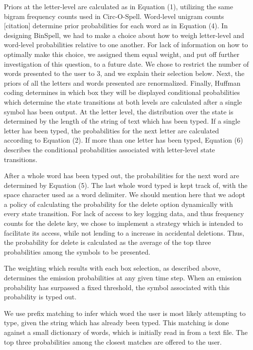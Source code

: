 \documentclass[12pt,titlepage]{article}
\begin{document}
Priors at the letter-level are calculated as in Equation (1), utilizing the same bigram frequency counts 
used in Circ-O-Spell.  Word-level unigram counts [citation] determine prior probabilities for each word 
as in Equation (4).  In designing BinSpell, we had to make a choice about how to weigh letter-level and 
word-level probabilities relative to one another.  For lack of information on how to optimally make this 
choice, we assigned them equal weight, and put off further investigation of this question, to a future 
date.  We chose to restrict the number of words presented to the user to 3, and we explain their 
selection below.  Next, the priors of all the letters and words presented are renormalized.  Finally, 
Huffman coding determines in which box they will be displayed conditional probabilities which 
determine the state transitions at both levels are calculated after a single symbol has been output.  At 
the letter level, the distribution over the state is determined by the length of the string of text which has 
been typed.  If a single letter has been typed, the probabilities for  the next letter are calculated 
according to Equation (2).  If more than one letter has been typed, Equation (6) describes the 
conditional probabilities associated with letter-level state transitions.

After a whole word has been typed out, the probabilities for the next word are determined by Equation 
(5).  The last whole word typed is kept track of, with the space character used as a word delimiter.  We 
should mention here that we adopt a policy of calculating the probability for the delete option 
dynamically with every state transition.  For lack of access to key logging data, and thus frequency 
counts for the delete key, we chose to implement a strategy which is intended to facilitate its access, 
while not lending to a increase in accidental deletions.   Thus, the probability for delete is calculated as 
the average of the top three probabilities among the symbols to be presented.

The weighting which results with each box selection, as described above, determines the emission 
probabilities at any given time step.  When an emission probability has surpassed a fixed threshold, the 
symbol associated with this probability is typed out.

We use prefix matching to infer which word the user is most likely attempting to type, given the string 
which has already been typed.  This matching is done against a small dictionary of words, which is 
initially read in from a text file.  The top three probabilities among the closest matches are offered to 
the user.
\end{document}
